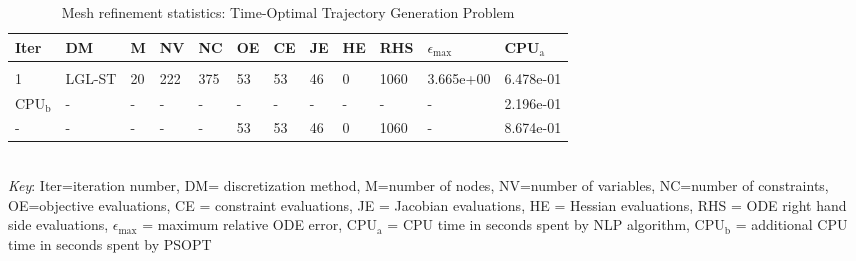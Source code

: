 
\begin{table}
\caption{Mesh refinement statistics: Time-Optimal Trajectory Generation Problem}
\label{mesh_stats_traj}
\renewcommand{\tabcolsep}{0.15cm}
\tiny
\begin{tabular}{llllllllllll}
Iter&DM&M&NV&NC&OE&CE&JE&HE&RHS&$\epsilon_{\max}$&CPU$_\mathrm{a}$ \\ \hline \\
1&LGL-ST&20&222&375&53&53&46&0&1060&3.665e+00&6.478e-01\\
\hline
CPU$_\mathrm{b}$ &-&-&-&-&-&-&-&-&-&-&2.196e-01\\
-&-&-&-&-&53&53&46&0&1060&-&8.674e-01\\
\end{tabular}
\newline \\ \emph{Key}: Iter=iteration number, DM= discretization method, M=number of nodes, NV=number of variables, NC=number of constraints, OE=objective evaluations,  	              CE = constraint evaluations, JE = Jacobian evaluations, HE = Hessian evaluations, RHS = ODE right hand side 		      evaluations, $\epsilon_{\max}$ = maximum relative ODE error, CPU$_\mathrm{a}$ = CPU time in seconds spent by NLP algorithm, 		      CPU$_\mathrm{b}$ = additional CPU time in seconds spent by PSOPT
\normalsize
\end{table}